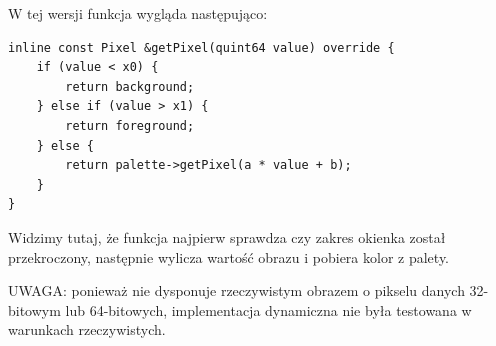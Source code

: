 \par
W tej wersji funkcja  wygląda następująco:
\par
\begin{lstlisting}
inline const Pixel &getPixel(quint64 value) override {
    if (value < x0) {
        return background;
    } else if (value > x1) {
        return foreground;
    } else {
        return palette->getPixel(a * value + b);
    }
}
\end{lstlisting}
\par
Widzimy tutaj, że funkcja najpierw sprawdza czy zakres okienka został przekroczony, następnie wylicza wartość obrazu i pobiera kolor z palety.
\par
UWAGA: ponieważ nie dysponuje rzeczywistym obrazem o pikselu danych 32-bitowym lub 64-bitowych, implementacja dynamiczna nie była testowana w warunkach rzeczywistych.

